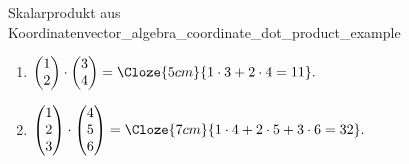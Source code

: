 \begin{ExampleBox}{Skalarprodukt aus Koordinaten}{vector_algebra_coordinate_dot_product_example}
  \begin{enumerate}[label=\alph*),leftmargin=1.8em,itemsep=1em]
    \item
      \(\displaystyle
        \begin{pmatrix}1\\2\end{pmatrix}
        \cdot
        \begin{pmatrix}3\\4\end{pmatrix}
        =\Cloze{5cm}{1\cdot3+2\cdot4=11}.
      \)

    \item
      \(\displaystyle
        \begin{pmatrix}1\\2\\3\end{pmatrix}
        \cdot
        \begin{pmatrix}4\\5\\6\end{pmatrix}
        =\Cloze{7cm}{1\cdot4+2\cdot5+3\cdot6=32}.
      \)
  \end{enumerate}
\end{ExampleBox}
